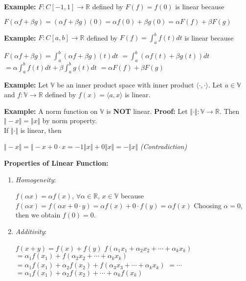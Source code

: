 \documentclass{article}
\begin{document}
\pagebreak

\textbf{Example:} $F: C[-1,1] \to \mathbb{R}$ defined by $F(f) = f(0)$ is linear because
\bigbreak
\begin{center}
    $F(\alpha f + \beta g) = (\alpha f + \beta g)(0) = \alpha f(0) + \beta g(0) = \alpha F(f) + \beta F(g)$
\end{center}

\bigbreak

\textbf{Example:} $F: C[a,b] \to \mathbb{R}$ defined by $F(f) = \int_{a}^{b} f(t) dt$ is linear because 
\bigbreak
\begin{center}
    $F(\alpha f + \beta g) = \int_{a}^{b} (\alpha f +  \beta g)(t) dt$ \bigbreak
    $ = \int_{a}^{b} (\alpha f(t) + \beta g(t)) dt$ \bigbreak
    $ = \alpha \int_{a}^{b} f(t) dt + \beta \int_{a}^{b} g(t) dt$ \bigbreak
    $ = \alpha F(f) + \beta F(g)$

\end{center}

\textbf{Example:} Let $\mathbb{V}$ be an inner product space with inner product $\langle \cdot,\cdot\rangle $. Let $a \in \mathbb{V}$ and $f: \mathbb{V} \to \mathbb{R}$ defined by $f(x) = \langle a,x\rangle $ is linear. 
\bigbreak

\textbf{Example:} A norm function on $\mathbb{V}$ is \textbf{NOT} linear. 
\bigbreak
\textbf{Proof:} 
Let $\Vert \cdot \Vert: \mathbb{V} \to \mathbb{R}$. Then $\Vert -x \Vert = \Vert x \Vert$ by norm property. \\
If $\Vert \cdot \Vert$ is linear, then \\
\begin{center}
    $\Vert -x \Vert = \Vert -x + 0 \cdot x = -1 \Vert x \Vert + 0 \Vert x \Vert = -\Vert x \Vert$ \textit{(Contradiction)}
\end{center}

\pagebreak


\textbf{Properties of Linear Function:} 
\begin{enumerate}
    \item \textit{Homogeneity}:
    \begin{center}
        $f(\alpha x) = \alpha f(x)$, $\forall \alpha \in \mathbb{R}$, $x \in \mathbb{V}$ \bigbreak
        because $f(\alpha x) = f(\alpha x + 0 \cdot y) = \alpha f(x) + 0 \cdot f(y) = \alpha f(x)$ \bigbreak
        Choosing $\alpha = 0$, then we obtain $f(0) = 0$.
    \end{center}
    \item \textit{Additivity}:
    \begin{center}
        $f(x + y) = f(x) + f(y)$ \bigbreak
        $f(\alpha_1 x_1 + \alpha_2 x_2 + \cdots + \alpha_k x_k)$ \bigbreak
        $= \alpha_1 f(x_1) + f(\alpha_2 x_2 + \cdots + \alpha_k x_k)$ \bigbreak
        $= \alpha_1 f(x_1) + \alpha_2 f(x_2) + f(\alpha_3 x_3 + \cdots + \alpha_k x_k) $ \bigbreak
        $= \cdots$ \bigbreak
        $= \alpha_1 f(x_1) + \alpha_2 f(x_2) + \cdots + \alpha_k f(x_k)$        
        
    \end{center}
\end{enumerate}
\end{document}
